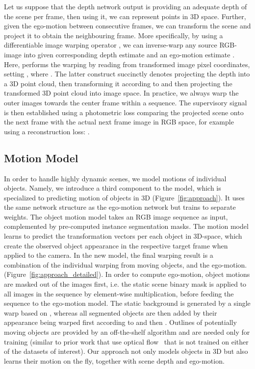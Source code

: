 \documentclass[10pt,twocolumn,letterpaper]{article}
\begin{document}
Let us suppose that the depth network output is providing an adequate depth of the scene per frame, then using it, we can represent points in 3D space. Further, given the ego-motion between consecutive frames, we can transform the scene and project it to obtain the neighbouring frame.
More specifically, by using a differentiable image warping operator , we can inverse-warp any source RGB-image  into  given corresponding depth estimate  and an ego-motion estimate . Here,  performs the warping by reading from transformed image pixel coordinates, setting , where .
The latter construct succinctly denotes projecting the depth into a 3D point cloud, then transforming it according to  and then projecting the transformed 3D point cloud into image space.
In practice, we always warp the outer images towards the center frame within a sequence.
The supervisory signal is then established using a photometric loss comparing the projected scene onto the next frame  with the actual next frame  image in RGB space, for example using a reconstruction loss: .

\subsection{Motion Model}
In order to handle highly dynamic scenes, we model motions of individual objects.
Namely, we introduce a third component  to the model, which is specialized to predicting motion of objects in 3D (Figure~\ref{fig:approach}).
It uses the same network structure as the ego-motion network  but trains to separate weights. The object motion model takes an RGB image sequence as input, complemented by pre-computed instance segmentation masks. The motion model learns to predict the transformation vectors per each object in 3D-space, which create the observed object appearance in the respective target frame when applied to the camera. In the new model, the final warping result is a combination of the individual warping from moving objects, and the ego-motion. (Figure~\ref{fig:approach_detailed}).
In order to compute ego-motion, object motions are masked out of the images first, i.e. the static scene binary mask is applied to all images in the sequence by element-wise multiplication, before feeding the sequence to the ego-motion model.
The static background is generated by a single warp based on , whereas all segmented objects are then added by their appearance being warped first according to  and then . Outlines of potentially moving objects are provided by an off-the-shelf algorithm \cite{he2017mask} and are needed only for training (similar to prior work that use optical flow~\cite{yang2018every} that is not trained on either of the datasets of interest). Our approach not only models objects in 3D but also learns their motion on the fly, together with scene depth and ego-motion.
\end{document}
